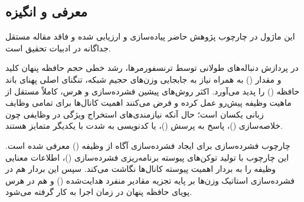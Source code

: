 \subsection{معرفی و انگیزه}
این ماژول در چارچوب پژوهش حاضر پیاده‌سازی و ارزیابی شده و فاقد مقاله مستقل جداگانه در ادبیات تحقیق است.

در پردازش دنباله‌های طولانی توسط ترنسفورمرها، رشد خطی حجم حافظه پنهان کلید و مقدار () به همراه نیاز به جابجایی وزن‌های حجیم شبکه، تنگنای اصلی پهنای باند حافظه () را پدید می‌آورد. اکثر روش‌های پیشین فشرده‌سازی و هرس، کاملاً مستقل از ماهیت وظیفه پیش‌رو عمل کرده و فرض می‌کنند اهمیت کانال‌ها برای تمامی وظایف زبانی یکسان است؛ حال آنکه نیازمندی‌های استخراج ویژگی در وظایفی چون خلاصه‌سازی ()، پاسخ به پرسش ()، یا کدنویسی به شدت با یکدیگر متمایز هستند.

چارچوب فشرده‌سازی  برای ایجاد فشرده‌سازی آگاه از وظیفه () معرفی شده است. این چارچوب با تولید توکن‌های پیوسته برنامه‌ریزی فشرده‌سازی ()، اطلاعات معنایی وظیفه را به بردار اهمیت پیوسته کانال‌ها نگاشت می‌کند. سپس این بردار هم در فشرده‌سازی استاتیک وزن‌ها بر پایه تجزیه مقادیر منفرد هدایت‌شده () و هم در هرس پویای حافظه پنهان  در زمان اجرا به کار گرفته می‌شود.
